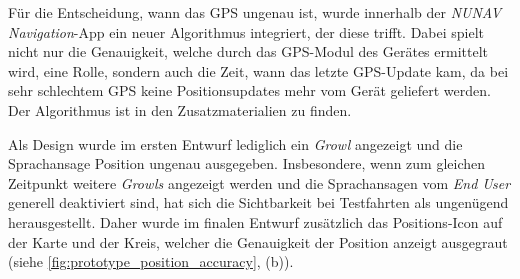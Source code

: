 Für die Entscheidung, wann das GPS ungenau ist, wurde innerhalb der \textit{NUNAV Navigation}-App ein neuer Algorithmus integriert, der diese trifft. Dabei spielt nicht nur die Genauigkeit, welche durch das GPS-Modul des Gerätes ermittelt wird, eine Rolle, sondern auch die Zeit, wann das letzte GPS-Update kam, da bei sehr schlechtem GPS keine Positionsupdates mehr vom Gerät geliefert werden. Der Algorithmus ist in den Zusatzmaterialien zu finden.

Als Design wurde im ersten Entwurf lediglich ein \textit{Growl} angezeigt und die Sprachansage \glqq Position ungenau\grqq{} ausgegeben. Insbesondere, wenn zum gleichen Zeitpunkt weitere \textit{Growls} angezeigt werden und die Sprachansagen vom \textit{End User} generell deaktiviert sind, hat sich die Sichtbarkeit bei Testfahrten als ungenügend herausgestellt. Daher wurde im finalen Entwurf zusätzlich das Positions-Icon auf der Karte und der Kreis, welcher die Genauigkeit der Position anzeigt ausgegraut (siehe \autoref{fig:prototype_position_accuracy}, (b)).